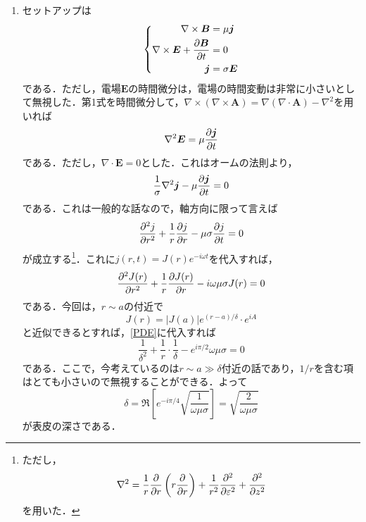 \documentclass[a4paper,pdflatex,ja=standard]{bxjsarticle}
\begin{document}
\begin{enumerate}
  \item 
  セットアップは
  \begin{equation}
    \left\{  
      \begin{alignedat}{1}
        \nabla\times\bm{B}
        &=
        \mu\bm{j}
        \\
        \nabla\times\bm{E}+\pdv{\bm{B}}{t}&=0
        \\
        \bm{j}&=\sigma\bm{E}
      \end{alignedat}
    \right.
  \end{equation}
  である．ただし，電場$\bm{E}$の時間微分は，電場の時間変動は非常に小さいとして無視した．第1式を時間微分して，$\nabla\times(\nabla\times\bm{A})=\nabla(\nabla\cdot\bm{A})-\nabla^2$を用いれば
  \begin{equation}
    \nabla^2\bm{E}
    =
    \mu\pdv{\bm{j}}{t}
  \end{equation}
  である．ただし，$\nabla\cdot\bm{E}=0$とした．これはオームの法則より，
  \begin{equation}
    \frac{1}{\sigma}\nabla^2\bm{j}
    -
    \mu\pdv{\bm{j}}{t}
    =
    0
  \end{equation}
  である．これは一般的な話なので，軸方向に限って言えば
  \begin{equation}
    \pdv[2]{j}{r}
    +
    \frac{1}{r}\pdv{j}{r}
    -
    \mu\sigma\pdv{j}{t}
    =
    0
  \end{equation}
  が成立する\footnote{
    ただし，
    \begin{equation}
      \nabla^2
      =
      \frac{1}{r}\pdv{}{r}\left( r\pdv{}{r} \right)
      +
      \frac{1}{r^2}\pdv[2]{}{\varepsilon}
      +
      \pdv[2]{}{z}
    \end{equation}
    を用いた．
  }．これに$j(r,t)=J(r)e^{-i\omega t}$を代入すれば，
  \begin{equation}
    \pdv[2]{J(r)}{r}
    +
    \frac{1}{r}\pdv{J(r)}{r}
    -
    i\omega\mu\sigma J(r)
    =
    0
    \label{PDE}
  \end{equation}
  である．今回は，$r\sim a$の付近で
  \begin{equation}
    J(r)
    =
    |J(a)|e^{(r-a)/\delta}\cdot e^{iA}
  \end{equation}
  と近似できるとすれば，\eqref{PDE}に代入すれば
  \begin{equation}
    \frac{1}{\delta^2}
    +
    \frac{1}{r}\cdot\frac{1}{\delta}
    -
    e^{i\pi/2}\omega\mu\sigma
    =
    0
  \end{equation}
  である．ここで，今考えているのは$r\sim a\gg \delta$付近の話であり，$1/r$を含む項はとても小さいので無視することができる．よって
  \begin{equation}
    \delta
    =
    \Re
    \left[  
      e^{-i\pi/4}\sqrt{\frac{1}{\omega\mu\sigma}}
    \right]      
    =
    \sqrt{\frac{2}{\omega\mu\sigma}}
  \end{equation}
  が表皮の深さである．

\end{enumerate}
\end{document}
